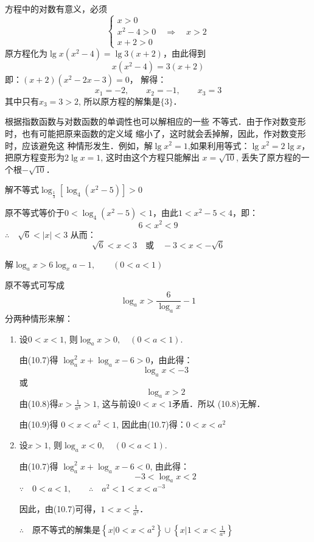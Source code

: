 \begin{solution}
  方程中的对数有意义，必须
    \[\begin{cases}
  x>0\\
  x^2-4>0\quad \Rightarrow\quad  x>2\\
  x+2>0
\end{cases}\]
原方程化为$\lg x(x^2-4)=\lg 3(x+2)$，由此得到
\[x(x^2-4)=3(x+2)\]
即：$(x+2)(x^2-2x-3)=0$，
解得：
\[x_1=-2,\qquad x_2=-1,\qquad x_3=3\]
其中只有$x_3=3>2$, 所以原方程的解集是$\{3\}$．
\end{solution}

根据指数函数与对数函数的单调性也可以解相应的一些
不等式．由于作对数变形时，也有可能把原来函数的定义域
缩小了，这时就会丢掉解，因此，作对数变形时，应该避免这
种情形发生．例如，解$\lg x^2=1$,如果利用等式：$\lg x^2
=2\lg x$，
把原方程变形为$2\lg x=1$, 这时由这个方程只能解出
$x=\sqrt{10}$, 丢失了原方程的一个根$-\sqrt{10}$．

\begin{example}
  解不等式$\log_{\tfrac{1}{3}}[\log_4 (x^2-5)]>0$
\end{example}

\begin{solution}
  原不等式等价于$0<\log_4(x^2-5)<1$，由此$1<x^2-5<4$，即：
\[6<x^2<9\]
$\therefore\quad \sqrt{6}<|x|<3$
从而：
\[\sqrt{6}<x<3\quad \text{或}\quad -3<x<-\sqrt{6}\]
\end{solution}

\begin{example}
  解$\log_a x>6\log_x a-1,\qquad (0<a<1)$
\end{example}

\begin{solution}
  原不等式可写成
\begin{equation}
  \log_a x>\frac{6}{\log_a x}-1
\end{equation}
分两种情形来解：
\begin{enumerate}
  \item 设$0<x<1$, 则$\log_a x>0,\quad (0<a<1)$.
  
由(10.7)得 $\log_a^2 x+\log_a x-6>0$，由此得：
\begin{equation}
  \log_a x<-3
\end{equation}
或
\begin{equation}
  \log_a x>2
\end{equation}
由(10.8)得$x>\frac{1}{a^3}>1$, 这与前设$0<x<1$矛盾．所以
(10.8)无解．

由(10.9)得 $0<x<a^2<1$, 因此由(10.7)得：$0<x<a^2$

\item 设$x>1$, 则$\log_a x<0,\quad (0<a<1)$.

由(10.7)得 $\log_a^2 x+\log_a x-6<0$, 由此得：
\[-3<\log_a x<2\]
$\because\quad 0<a<1,\qquad \therefore\quad a^2<1<x<a^{-3}$

因此，由(10.7)可得，$1<x<\frac{1}{a^3}$．

$\therefore\quad $原不等式的解集是$\left\{x|0<x<a^2\right\}\cup\left\{x\Big|1<x<\frac{1}{a^3}\right\}$
\end{enumerate}
\end{solution}

